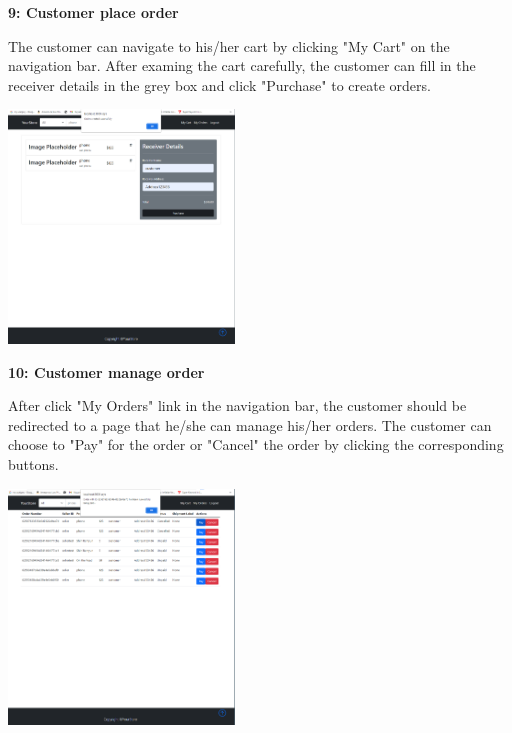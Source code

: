 \documentclass[12pt]{article}
\begin{document}
\vspace*{5mm}
\textbf{9: Customer place order}

The customer can navigate to his/her cart by clicking "My Cart" on the navigation bar. After examing
the cart carefully, the customer can fill in the receiver details in the grey box and click "Purchase" to create orders.

\includegraphics[width=0.45\textwidth]{UserGuideImage/16.png}

\newpage
\textbf{10: Customer manage order}

After click "My Orders" link in the navigation bar, the customer should be redirected to a page that he/she can manage
his/her orders. The customer can choose to "Pay" for the order or "Cancel" the order by clicking
the corresponding buttons.

\includegraphics[width=0.45\textwidth]{UserGuideImage/17.png}
\end{document}
